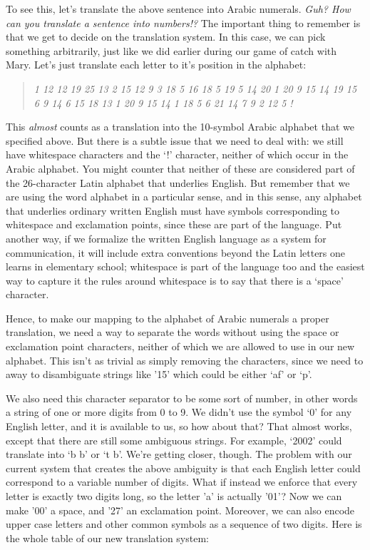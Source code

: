 \documentclass[UTF8]{book}
\begin{document}
\begin{CJK}{UTF8}{gbsn}
To see this, let's translate the above sentence into Arabic numerals. \emph{Guh? How can you translate a sentence into numbers!?} The important thing to remember is that we get to decide on the translation system. In this case, we can pick something arbitrarily, just like we did earlier during our game of catch with Mary. Let's just translate each letter to it's position in the alphabet:

\begin{quotation}
\centering
\emph{1 12 12  19 25 13 2 15 12 9 3  18 5 16 18 5 19 5 14 20 1 20 9 15 14 19  15 6  9 14 6 15 18 13 1 20 9 15 14  1 18 5  6 21 14 7 9 2 12 5 !}
\end{quotation}

This \emph{almost} counts as a translation into the 10-symbol Arabic alphabet that we specified above. But there is a subtle issue that we need to deal with: we still have whitespace characters and the `!' character, neither of which occur in the Arabic alphabet. You might counter that neither of these are considered part of the 26-character Latin alphabet that underlies English. But remember that we are using the word alphabet in a particular sense, and in this sense, any alphabet that underlies ordinary written English must have symbols corresponding to whitespace and exclamation points, since these are part of the language. Put another way, if we formalize the written English language as a system for communication, it will include extra conventions beyond the Latin letters one learns in elementary school; whitespace is part of the language too and the easiest way to capture it the rules around whitespace is to say that there is a `space' character.

Hence, to make our mapping to the alphabet of Arabic numerals a proper translation, we need a way to separate the words without using the space or exclamation point characters, neither of which we are allowed to use in our new alphabet. This isn't as trivial as simply removing the characters, since we need to away to disambiguate strings like '15' which could be either `af' or `p'.

We also need this character separator to be some sort of number, in other words a string of one or more digits from 0 to 9. We didn't use the symbol `0' for any English letter, and it is available to us, so how about that? That almost works, except that there are still some ambiguous strings. For example, `2002' could translate into `b  b' or `t b'. We're getting closer, though. The problem with our current system that creates the above ambiguity is that each English letter could correspond to a variable number of digits. What if instead we enforce that every letter is exactly two digits long, so the letter 'a' is actually '01'? Now we can make '00' a space, and '27' an exclamation point. Moreover, we can also encode upper case letters and other common symbols as a sequence of two digits. Here is the whole table of our new translation system:


\end{CJK}
\end{document}
